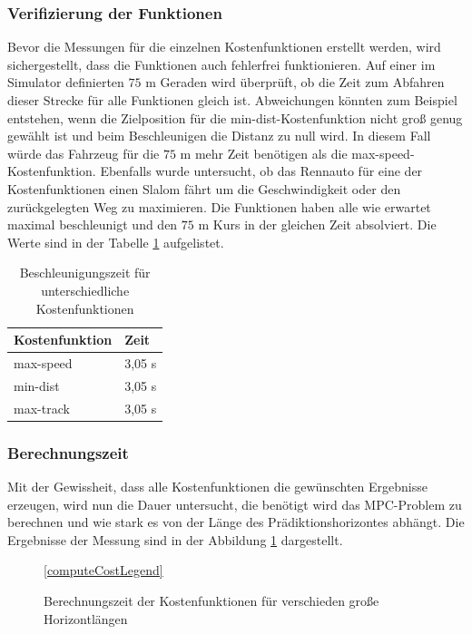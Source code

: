 \documentclass{like}
\begin{document}
\subsubsection{Verifizierung der Funktionen}
Bevor die Messungen für die einzelnen Kostenfunktionen erstellt werden, wird sichergestellt, dass die Funktionen auch fehlerfrei funktionieren. Auf einer im Simulator definierten $75$ m Geraden wird überprüft, ob die Zeit zum Abfahren dieser Strecke für alle Funktionen gleich ist. Abweichungen könnten zum Beispiel entstehen, wenn die Zielposition für die min-dist-Kostenfunktion nicht groß genug gewählt ist und beim Beschleunigen die Distanz zu null wird. In diesem Fall würde das Fahrzeug für die $75$ m mehr Zeit benötigen als die max-speed-Kostenfunktion. Ebenfalls wurde untersucht, ob das Rennauto für eine der Kostenfunktionen einen Slalom fährt um die Geschwindigkeit oder den zurückgelegten Weg zu maximieren. Die Funktionen haben alle wie erwartet maximal beschleunigt und den $75$ m Kurs in der gleichen Zeit absolviert. Die Werte sind in der Tabelle \ref{accVerification} aufgelistet.

\begin{table}[ht!]
	\centering
	\begin{tabular}{l|l}
		\hline
		Kostenfunktion	& Zeit  \\ \hline
		max-speed	&	3,05 s \\
		min-dist	&	3,05 s \\
		max-track	&	3,05 s \\

	\end{tabular}
	\caption{Beschleunigungszeit für unterschiedliche Kostenfunktionen}
	\label{accVerification}
\end{table}

\subsubsection{Berechnungszeit}
\label{runtime}
Mit der Gewissheit, dass alle Kostenfunktionen die gewünschten Ergebnisse erzeugen, wird nun die Dauer untersucht, die benötigt wird das \ac{MPC}-Problem zu berechnen und wie stark es von der Länge des Prädiktionshorizontes abhängt. 
Die Ergebnisse der Messung sind in der Abbildung \ref{fig:computeCost} dargestellt.

\begin{figure}[ht!]
	\centering
	
	\ref{computeCostLegend}
	\caption{Berechnungszeit der Kostenfunktionen für verschieden große Horizontlängen}\label{fig:computeCost}
\end{figure}
\end{document}
